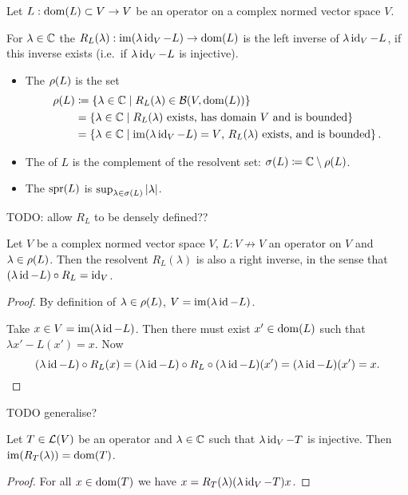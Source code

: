 \begin{definition}
Let $L: \operatorname{dom}(L)\subset V \to V$ be an operator on a complex normed vector space $V$.

For $\lambda\in\mathbb{C}$ the  $R_L(\lambda): \operatorname{im}(\lambda \operatorname{id}_V - L)\to\operatorname{dom}(L)$ is the left inverse of $\lambda \operatorname{id}_V - L$, if this inverse exists (i.e.\ if $\lambda \operatorname{id}_V - L$ is injective).
\begin{itemize}
\item The  $\rho(L)$ is the set
\begin{align*}
\rho(L) &\coloneqq \left\{ \lambda\in \mathbb{C} \;\middle|\; R_L(\lambda)\in\operatorname{\mathcal{B}}(V, \operatorname{dom}(L)) \right\} \\
&= \left\{ \lambda\in \mathbb{C} \;\middle|\; \text{$R_L(\lambda)$ exists, has domain $V$ and is bounded} \right\} \\
&= \left\{ \lambda\in \mathbb{C} \;\middle|\; \text{$\operatorname{im}(\lambda\operatorname{id}_V - L) = V$, $R_L(\lambda)$ exists, and is bounded} \right\}.
\end{align*}
\item The  of $L$ is the complement of the resolvent set: $\sigma(L) \coloneqq \mathbb{C}\setminus\rho(L)$.
\item The  $\operatorname{spr}(L)$ is $\sup_{\lambda\in\sigma(L)} |\lambda|$.
\end{itemize}
\end{definition}

TODO: allow $R_L$ to be densely defined??

\begin{lemma}
Let $V$ be a complex normed vector space $V$, $L: V\not\to V$ an operator on $V$ and $\lambda\in\rho(L)$. Then the resolvent $R_L(\lambda)$ is also a right inverse, in the sense that $(\lambda\operatorname{id} - L)\circ R_L = \operatorname{id}_V$.
\end{lemma}
\begin{proof}
By definition of $\lambda\in\rho(L)$, $V = \operatorname{im}(\lambda \operatorname{id} - L)$.

Take $x\in V = \operatorname{im}(\lambda \operatorname{id} - L)$. Then there must exist $x'\in \operatorname{dom}(L)$ such that $\lambda x' - L(x') = x$. Now
\[ (\lambda\operatorname{id} - L)\circ R_L(x) = (\lambda\operatorname{id} - L)\circ R_L \circ (\lambda\operatorname{id} - L) (x') = (\lambda\operatorname{id} - L)(x') = x. \]
\end{proof}
TODO generalise?

\begin{lemma}
Let $T\in\operatorname{\mathcal{L}}(V)$ be an operator and $\lambda\in\mathbb{C}$ such that $\lambda\operatorname{id}_V - T$ is injective. Then $\operatorname{im}(R_T(\lambda)) = \operatorname{dom}(T)$.
\end{lemma}
\begin{proof}
For all $x\in \operatorname{dom}(T)$ we have $x = R_T(\lambda)(\lambda\operatorname{id}_V - T)x$.
\end{proof}

